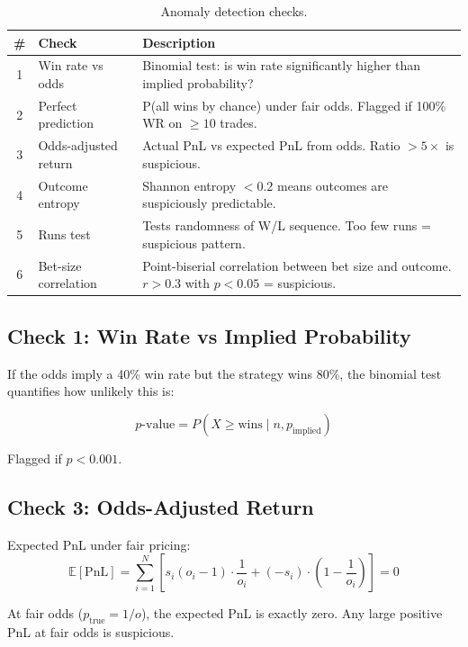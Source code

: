 \documentclass[12pt,a4paper]{report}
\theoremstyle{definition}
\newcommand{\pnl}{\text{PnL}}
\newcommand{\E}{\mathbb{E}}
\begin{document}
\begin{table}[H]
\centering
\caption{Anomaly detection checks.}
\label{tab:anomaly-checks}
\begin{tabularx}{\textwidth}{clX}
\toprule
\textbf{\#} & \textbf{Check} & \textbf{Description} \\
\midrule
1 & Win rate vs odds & Binomial test: is win rate significantly higher than implied probability? \\
2 & Perfect prediction & P(all wins by chance) under fair odds. Flagged if 100\% WR on $\geq 10$ trades. \\
3 & Odds-adjusted return & Actual PnL vs expected PnL from odds. Ratio $> 5\times$ is suspicious. \\
4 & Outcome entropy & Shannon entropy $< 0.2$ means outcomes are suspiciously predictable. \\
5 & Runs test & Tests randomness of W/L sequence. Too few runs = suspicious pattern. \\
6 & Bet-size correlation & Point-biserial correlation between bet size and outcome. $r > 0.3$ with $p < 0.05$ = suspicious. \\
\bottomrule
\end{tabularx}
\end{table}

\subsection{Check 1: Win Rate vs Implied Probability}

If the odds imply a 40\% win rate but the strategy wins 80\%, the binomial test quantifies how unlikely this is:

\begin{equation}
    p\text{-value} = P(X \geq \text{wins} \mid n, p_{\text{implied}})
\end{equation}

Flagged if $p < 0.001$.

\subsection{Check 3: Odds-Adjusted Return}

Expected PnL under fair pricing:
\begin{equation}
    \E[\pnl] = \sum_{i=1}^{N} \left[s_i(o_i - 1) \cdot \frac{1}{o_i} + (-s_i) \cdot \left(1 - \frac{1}{o_i}\right)\right] = 0
\end{equation}

At fair odds ($p_{\text{true}} = 1/o$), the expected PnL is exactly zero. Any large positive PnL at fair odds is suspicious.
\end{document}
